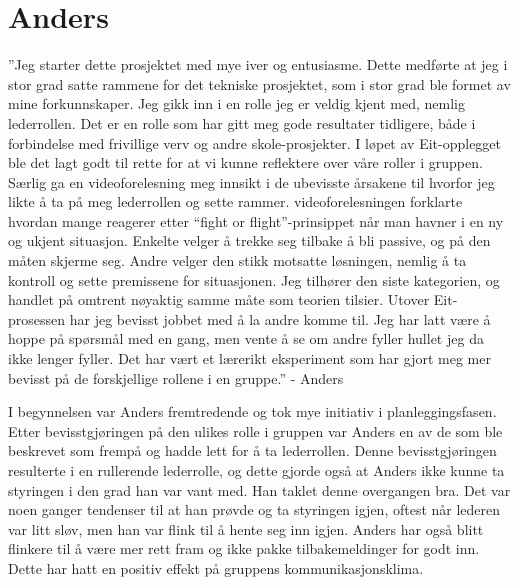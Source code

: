 \section{Anders}
''Jeg starter dette prosjektet med mye iver og entusiasme. 
Dette medførte at jeg i stor grad satte rammene for det tekniske prosjektet, som i stor grad ble formet av mine forkunnskaper.
Jeg gikk inn i en rolle jeg er veldig kjent med, nemlig lederrollen. 
Det er en rolle som har gitt meg gode resultater tidligere, både i forbindelse med frivillige verv og andre skole-prosjekter.
I løpet av Eit-opplegget ble det lagt godt til rette for at vi kunne reflektere over våre roller i gruppen.
Særlig ga en videoforelesning meg innsikt i de ubevisste årsakene til hvorfor jeg likte å ta på meg lederrollen og sette rammer. 
videoforelesningen forklarte hvordan mange reagerer etter ``fight or flight''-prinsippet når man havner i en ny og ukjent situasjon.
Enkelte velger å trekke seg tilbake å bli passive, og på den måten skjerme seg. 
Andre velger den stikk motsatte løsningen, nemlig å ta kontroll og sette premissene for situasjonen. 
Jeg tilhører den siste kategorien, og handlet på omtrent nøyaktig samme måte som teorien tilsier.
Utover Eit-prosessen har jeg bevisst jobbet med å la andre komme til.
Jeg har latt være å hoppe på spørsmål med en gang, men vente å se om andre fyller hullet jeg da ikke lenger fyller. Det har vært et lærerikt eksperiment som har gjort meg mer bevisst på de forskjellige rollene i en gruppe.'' \hfill - Anders
\vspace{\secspace}

I begynnelsen var Anders fremtredende og tok mye initiativ i planleggingsfasen. 
Etter bevisstgjøringen på den ulikes rolle i gruppen var Anders en av de som ble beskrevet som frempå og hadde lett for å ta lederrollen. 
Denne bevisstgjøringen resulterte i en rullerende lederrolle, og dette gjorde også at Anders ikke kunne ta styringen i den grad han var vant med. 
Han taklet denne overgangen bra. 
Det var noen ganger tendenser til at han prøvde og ta styringen igjen, oftest når lederen var litt sløv, men han var flink til å hente seg inn igjen. 
Anders har også blitt flinkere til å være mer rett fram og ikke pakke tilbakemeldinger for godt inn. 
Dette har hatt en positiv effekt på gruppens kommunikasjonsklima. 

